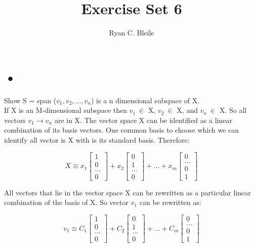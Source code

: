 \documentclass[12pt]{article}
\title{Exercise Set 6}
\author{Ryan C. Bleile}
\begin{document}
\maketitle

\section{•}
Show S = span ($v_1 , v_2 , ... , v_n$) is a n dimensional subspace of X.\\
If X is an M-dimensional subspace then $v_1 \ \in$ X, $v_2 \ \in$ X, and $v_n \ \in$ X. So all vectors $v_1 \rightarrow v_n$ are in X. The vector space X can be identified as a linear combination of its basis vectors. One common basis to choose which we can identify all vector is X with is its standard basis. Therefore:

\[
X \equiv
x_1
\begin{bmatrix}
1\\
0\\
...\\
0
\end{bmatrix}
+ x_2
\begin{bmatrix}
0\\
1\\
...\\
0
\end{bmatrix}
+ ...
+ x_m
\begin{bmatrix}
0\\
...\\
0\\
1
\end{bmatrix}
\]

All vectors that lie in the vector space X can be rewritten as a particular linear combination of the basis of X. So vector $v_1$ can be rewritten as: 


\[
v_1 \equiv
C_1
\begin{bmatrix}
1\\
0\\
...\\
0
\end{bmatrix}
+ C_2
\begin{bmatrix}
0\\
1\\
...\\
0
\end{bmatrix}
+ ...
+ C_m
\begin{bmatrix}
0\\
...\\
0\\
1
\end{bmatrix}
\]
\end{document}
